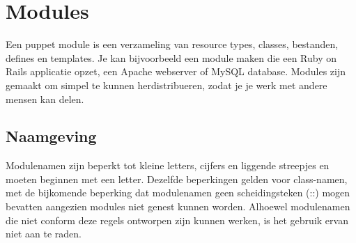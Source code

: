 \chapter{Modules}

Een puppet module is een verzameling van resource types, classes, bestanden, defines en templates. Je kan bijvoorbeeld een module maken die een Ruby on Rails applicatie opzet, een Apache webserver of MySQL database. Modules zijn gemaakt om simpel te kunnen herdistribueren, zodat je je werk met andere mensen kan delen.
%
\section{Naamgeving}
Modulenamen zijn beperkt tot kleine letters, cijfers en liggende streepjes en moeten beginnen met een letter. Dezelfde beperkingen gelden voor class-namen, met de bijkomende beperking dat modulenamen geen scheidingsteken (::) mogen bevatten aangezien modules niet genest kunnen worden. Alhoewel modulenamen die niet conform deze regels ontworpen zijn kunnen werken, is het gebruik ervan niet aan te raden.
%
